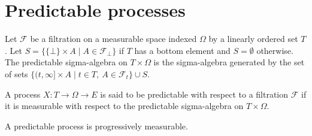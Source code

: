 \section{Predictable processes}


\begin{definition}\label{def:predictableMeasurableSpace}
  \mathlibok
Let $\mathcal{F}$ be a filtration on a measurable space indexed $\Omega$ by a linearly ordered set $T$.
Let $S = \{\{\bot\} \times A \mid A \in \mathcal{F}_\bot\}$ if $T$ has a bottom element and $S = \emptyset$ otherwise.
The predictable sigma-algebra on $T \times \Omega$ is the sigma-algebra generated by the set of sets $\{(t, \infty] \times A \mid t \in T, \: A \in \mathcal{F}_t\} \cup S$.
\end{definition}


\begin{definition}\label{def:predictable}
  \mathlibok
A process $X : T \to \Omega \to E$ is said to be predictable with respect to a filtration $\mathcal{F}$ if it is measurable with respect to the predictable sigma-algebra on $T \times \Omega$.
\end{definition}


\begin{lemma}\label{lem:Predictable.progressive}
  \mathlibok
A predictable process is progressively measurable.
\end{lemma}

